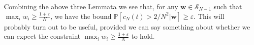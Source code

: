 \documentclass{article}
\newcommand{\PR}{\mathbb{P}}
\begin{document}
Combining the above three Lemmata we see that, for any $\mathbf{w} \in \mathcal{S}_{N-1}$ such that $\max_i w_i \geq \frac{1 + \varepsilon}{N}$, we have the bound $\PR[ c_N(t) > 2/N^2 | \mathbf{w} ] \geq \varepsilon$. This will probably turn out to be useful, provided we can say something about whether we can expect the constraint $\max_i w_i \geq \frac{1 + \varepsilon}{N}$ to hold.
\end{document}

